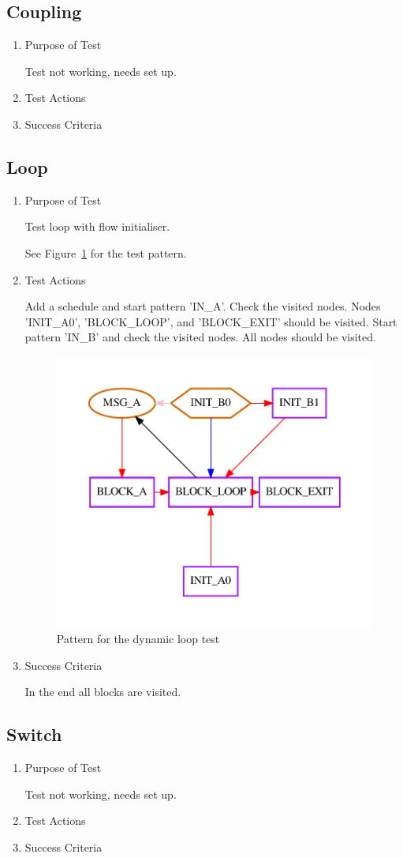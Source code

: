 \documentclass[12pt,a4paper]{report}
\begin{document}
\subsection{Coupling}
\begin{enumerate}
	\item Purpose of Test

	Test not working, needs set up.
	\item Test Actions
	\item Success Criteria
\end{enumerate}
\subsection{Loop}
\begin{enumerate}
	\item Purpose of Test

    Test loop with flow initialiser.

	See Figure~\ref{fig:Pattern_for_the_dynamic_loop_test} for the test pattern.
	\item Test Actions

    Add a schedule and start pattern 'IN\_A'. Check the visited nodes. Nodes 'INIT\_A0', 'BLOCK\_LOOP', and 'BLOCK\_EXIT' should be visited. Start pattern 'IN\_B' and check the visited nodes. All nodes should be visited.
    \begin{figure}
        \centering 
        \includegraphics{TestPattern/dynamic_loop.pdf}
        \caption{Pattern for the dynamic loop test}
        \label{fig:Pattern_for_the_dynamic_loop_test}
    \end{figure}
	\item Success Criteria

	In the end all blocks are visited.
\end{enumerate}
\subsection{Switch}
\begin{enumerate}
	\item Purpose of Test

	Test not working, needs set up.
	\item Test Actions
	\item Success Criteria
\end{enumerate}
\end{document}

